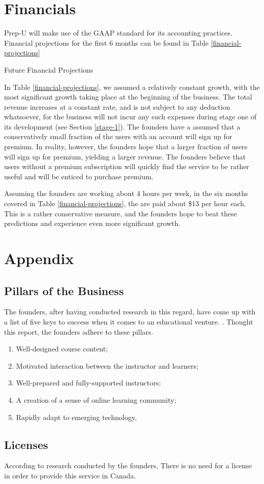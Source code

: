 \documentclass{business}
\begin{document}
    \section{Financials}
    Prep-U will make use of the GAAP standard for its accounting practices. Financial projections for the first 6 months can be found in Table \ref{financial-projections}\par
    \begin{table}[H]
        \caption{Future Financial Projections}
        \label{financial-projections}
    \end{table}
    In Table \ref{financial-projections}, we assumed a relatively constant growth, with the most significant growth taking place at the beginning of the business. The total revenue increases at a constant rate, and is not subject to any deduction whatsoever, for the business will not incur any such expenses during stage one of its development (see Section \ref{stage-1}). The founders have a assumed that a conservatively small fraction of the users with an account will sign up for premium. In reality, however, the founders hope that a larger fraction of users will sign up for premium, yielding a larger revenue. The founders believe that users without a premium subscription will quickly find the service to be rather useful and will be enticed to purchase premium.\par
    Assuming the founders are working about 4 hours per week, in the six months covered in Table \ref{financial-projections}, the are paid about \$13 per hour each. This is a rather conservative measure, and the founders hope to beat these predictions and experience even more significant growth.
    \newpage
    \section{Appendix}
    \subsection{Pillars of the Business}\label{pillars}
    The founders, after having conducted research in this regard, have come up with a list of five keys to success when it comes to an educational venture. \cite{Sun2016}. Thought this report, the founders adhere to these pillars. \par
    \begin{enumerate}
        \renewcommand{\theenumi}{(\Roman{enumi})}
        \item Well-designed course content;
        \item Motivated interaction between the instructor and learners;
        \item Well-prepared and fully-supported instructors;
        \item A creation of a sense of online learning community; 
        \item Rapidly adapt to emerging technology.
    \end{enumerate}
    \subsection{Licenses}
    According to research conducted by the founders, There is no need for a license in order to provide this service in Canada.
    \newpage
    
    
\end{document}
